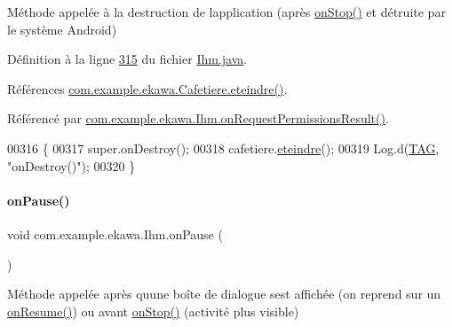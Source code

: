Méthode appelée à la destruction de l\textquotesingle{}application (après \hyperlink{classcom_1_1example_1_1ekawa_1_1_ihm_adc7bc6671d8cd5018724bcbf4fbc0d75}{on\+Stop()} et détruite par le système Android) 



Définition à la ligne \hyperlink{_ihm_8java_source_l00315}{315} du fichier \hyperlink{_ihm_8java_source}{Ihm.\+java}.



Références \hyperlink{_cafetiere_8java_source_l00424}{com.\+example.\+ekawa.\+Cafetiere.\+eteindre()}.



Référencé par \hyperlink{_ihm_8java_source_l00338}{com.\+example.\+ekawa.\+Ihm.\+on\+Request\+Permissions\+Result()}.


\begin{DoxyCode}
00316     \{
00317         super.onDestroy();
00318         cafetiere.\hyperlink{classcom_1_1example_1_1ekawa_1_1_cafetiere_acca6b757d8fad0d0faf64f3266557ca2}{eteindre}();
00319         Log.d(\hyperlink{classcom_1_1example_1_1ekawa_1_1_ihm_a95cd92c2acaf9f8982302da08d94f9aa}{TAG}, \textcolor{stringliteral}{"onDestroy()"});
00320     \}
\end{DoxyCode}
\mbox{\label{classcom_1_1example_1_1ekawa_1_1_ihm_a4cf2ee6861e571d2634a4dd2492e9be9}} 
\paragraph{\texorpdfstring{on\+Pause()}{onPause()}}
{\footnotesize\ttfamily void com.\+example.\+ekawa.\+Ihm.\+on\+Pause (\begin{DoxyParamCaption}{ }\end{DoxyParamCaption})\hspace{0.3cm}{\ttfamily [protected]}}



Méthode appelée après qu\textquotesingle{}une boîte de dialogue s\textquotesingle{}est affichée (on reprend sur un \hyperlink{classcom_1_1example_1_1ekawa_1_1_ihm_aec9b38c2990ae4bdee8df0b49253120f}{on\+Resume()}) ou avant \hyperlink{classcom_1_1example_1_1ekawa_1_1_ihm_adc7bc6671d8cd5018724bcbf4fbc0d75}{on\+Stop()} (activité plus visible) 



